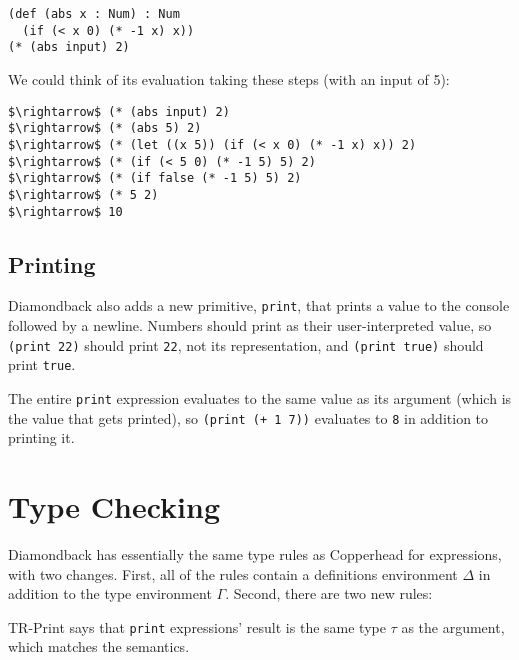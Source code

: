 \documentclass[10pt, oneside]{article}
\begin{document}
\begin{lstlisting}
(def (abs x : Num) : Num
  (if (< x 0) (* -1 x) x))
(* (abs input) 2)
\end{lstlisting}

We could think of its evaluation taking these steps (with an input of 5):

\begin{lstlisting}
$\rightarrow$ (* (abs input) 2)
$\rightarrow$ (* (abs 5) 2)
$\rightarrow$ (* (let ((x 5)) (if (< x 0) (* -1 x) x)) 2)
$\rightarrow$ (* (if (< 5 0) (* -1 5) 5) 2)
$\rightarrow$ (* (if false (* -1 5) 5) 2)
$\rightarrow$ (* 5 2)
$\rightarrow$ 10
\end{lstlisting}

\subsection*{Printing}

Diamondback also adds a new primitive, {\tt print}, that prints a value to
the console followed by a newline. Numbers should print as their
user-interpreted value, so {\tt (print 22)} should print {\tt 22}, not its
representation, and {\tt (print true)} should print {\tt true}.

The entire {\tt print} expression evaluates to the same value as its argument
(which is the value that gets printed), so {\tt (print (+ 1 7))} evaluates to
{\tt 8} in addition to printing it.

\section*{Type Checking}

Diamondback has essentially the same type rules as Copperhead for
expressions, with two changes. First, all of the rules contain a definitions
environment $\Delta$ in addition to the type environment $\Gamma$. Second,
there are two new rules:


TR-Print says that {\tt print} expressions' result is the same type $\tau$ as
the argument, which matches the semantics.
\end{document}
